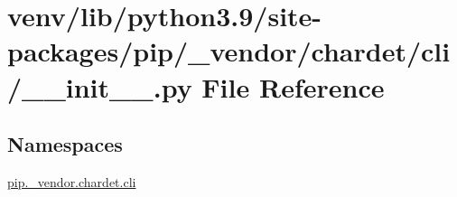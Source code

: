 \hypertarget{venv_2lib_2python3_89_2site-packages_2pip_2__vendor_2chardet_2cli_2____init_____8py}{}\section{venv/lib/python3.9/site-\/packages/pip/\+\_\+vendor/chardet/cli/\+\_\+\+\_\+init\+\_\+\+\_\+.py File Reference}
\label{venv_2lib_2python3_89_2site-packages_2pip_2__vendor_2chardet_2cli_2____init_____8py}
\subsection*{Namespaces}
\begin{DoxyCompactItemize}
\item 
 \hyperlink{namespacepip_1_1__vendor_1_1chardet_1_1cli}{pip.\+\_\+vendor.\+chardet.\+cli}
\end{DoxyCompactItemize}
